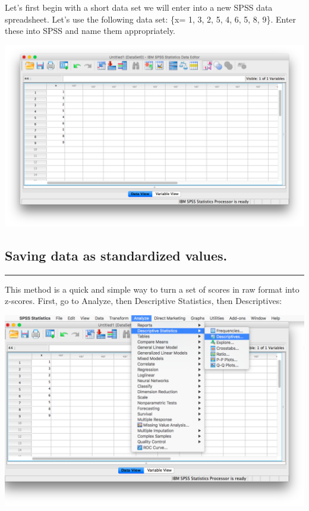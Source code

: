 \documentclass[
]{book}
\begin{document}
Let's first begin with a short data set we will enter into a new SPSS data spreadsheet. Let's use the following data set: \{x= 1, 3, 2, 5, 4, 6, 5, 8, 9\}. Enter these into SPSS and name them appropriately.

\includegraphics{img/4.4.11.png}

\hypertarget{saving-data-as-standardized-values.}{%
\subsection{Saving data as standardized values.}\label{saving-data-as-standardized-values.}}

\begin{center}\rule{0.5\linewidth}{0.5pt}\end{center}

This method is a quick and simple way to turn a set of scores in raw format into z-scores. First, go to {Analyze}, then {Descriptive Statistics}, then {Descriptives}:

\includegraphics{img/4.4.12.png}
\end{document}
